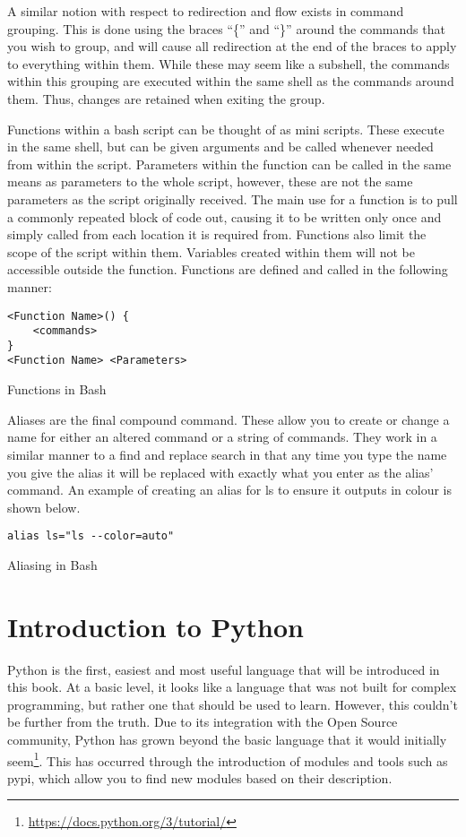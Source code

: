 			A similar notion with respect to redirection and flow exists in command grouping.
			This is done using the braces ``\{'' and ``\}'' around the commands that you wish to group, and will cause all redirection at the end of the braces to apply to everything within them.
			While these may seem like a subshell, the commands within this grouping are executed within the same shell as the commands around them.
			Thus, changes are retained when exiting the group.

			Functions within a bash script can be thought of as mini scripts.
			These execute in the same shell, but can be given arguments and be called whenever needed from within the script.
			Parameters within the function can be called in the same means as parameters to the whole script, however, these are not the same parameters as the script originally received.
			The main use for a function is to pull a commonly repeated block of code out, causing it to be written only once and simply called from each location it is required from.
			Functions also limit the scope of the script within them.
			Variables created within them will not be accessible outside the function.
			Functions are defined and called in the following manner:
			\begin{code}
			\begin{verbatim}
<Function Name>() {
	<commands>
}
<Function Name> <Parameters>
			\end{verbatim}
			\label{code:bashFunctions}
			\caption{Functions in Bash}
			\end{code}


			Aliases are the final compound command.
			These allow you to create or change a name for either an altered command or a string of commands.
			They work in a similar manner to a find and replace search in that any time you type the name you give the alias it will be replaced with exactly what you enter as the alias' command.
			An example of creating an alias for ls to ensure it outputs in colour is shown below.
			\begin{code}
			\begin{verbatim}
alias ls="ls --color=auto"
			\end{verbatim}
			\label{code:bashAlias}
			\caption{Aliasing in Bash}
			\end{code}
	\section{Introduction to Python}
		Python is the first, easiest and most useful language that will be introduced in this book.\cite{PythonBoringStuff}
		At a basic level, it looks like a language that was not built for complex programming, but rather one that should be used to learn.
		However, this couldn't be further from the truth.
		Due to its integration with the Open Source community, Python has grown beyond the basic language that it would initially seem\footnote{\url{https://docs.python.org/3/tutorial/}}.
		This has occurred through the introduction of modules and tools such as pypi, which allow you to find new modules based on their description.
